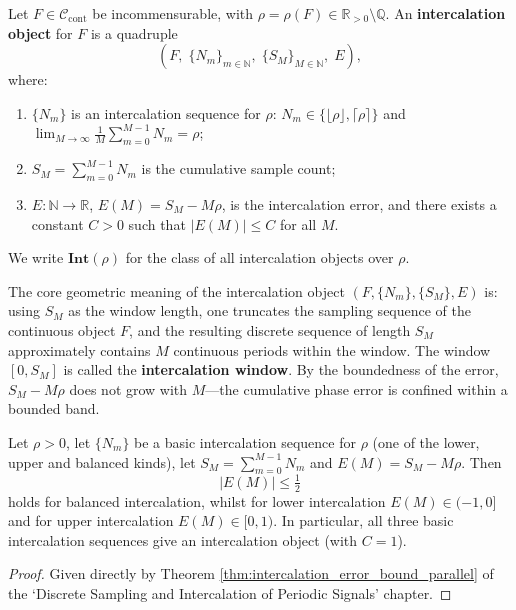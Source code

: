 \begin{definition}\label{def:intercalation_object}
Let $F\in\mathcal{C}_{\text{cont}}$ be incommensurable, with $\rho=\rho(F)\in\mathbb{R}_{>0}\setminus\mathbb{Q}$. An \textbf{intercalation object} for $F$ is a quadruple
\[
(F,\;\{N_m\}_{m\in\mathbb{N}},\;\{S_M\}_{M\in\mathbb{N}},\;E),
\]
where:
\begin{enumerate}[label=(\roman*)]
    \item $\{N_m\}$ is an intercalation sequence for $\rho$: $N_m\in\{\lfloor\rho\rfloor,\lceil\rho\rceil\}$ and $\lim_{M\to\infty}\frac{1}{M}\sum_{m=0}^{M-1}N_m=\rho$;
    \item $S_M=\sum_{m=0}^{M-1}N_m$ is the cumulative sample count;
    \item $E:\mathbb{N}\to\mathbb{R}$, $E(M)=S_M-M\rho$, is the intercalation error, and there exists a constant $C>0$ such that $|E(M)|\le C$ for all $M$.
\end{enumerate}
We write $\mathbf{Int}(\rho)$ for the class of all intercalation objects over $\rho$.
\end{definition}

\begin{remark}\label{rem:intercalation_object_window}
The core geometric meaning of the intercalation object $(F,\{N_m\},\{S_M\},E)$ is: using $S_M$ as the window length, one truncates the sampling sequence of the continuous object $F$, and the resulting discrete sequence of length $S_M$ approximately contains $M$ continuous periods within the window. The window $[0,S_M]$ is called the \textbf{intercalation window}. By the boundedness of the error, $S_M-M\rho$ does not grow with $M$---the cumulative phase error is confined within a bounded band.
\end{remark}

\begin{lemma}\label{lem:intercalation_error_bound_category}
Let $\rho>0$, let $\{N_m\}$ be a basic intercalation sequence for $\rho$ (one of the lower, upper and balanced kinds), let $S_M=\sum_{m=0}^{M-1}N_m$ and $E(M)=S_M-M\rho$. Then
\[
|E(M)|\le \tfrac{1}{2}
\]
holds for balanced intercalation, whilst for lower intercalation $E(M)\in(-1,0]$ and for upper intercalation $E(M)\in[0,1)$. In particular, all three basic intercalation sequences give an intercalation object (with $C=1$).
\end{lemma}

\begin{proof}
Given directly by Theorem \ref{thm:intercalation_error_bound_parallel} of the `Discrete Sampling and Intercalation of Periodic Signals' chapter.
\end{proof}


